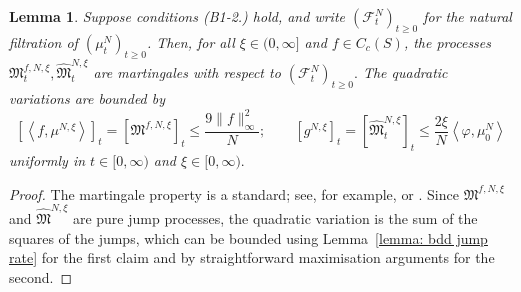 \documentclass[11pt, notitlepage]{article}
\newtheorem{lem}[thm]{Lemma}
\begin{document}
\begin{lem}\label{lemma: qvar}
Suppose conditions (B1-2.) hold, and write $(\mathcal{F}^{N}_t)_{t\ge 0}$ for the natural filtration of $(\mu^N_t)_{t\ge 0}$. Then, for all $\xi \in (0, \infty]$ and $f\in C_c(S)$, the processes $\mathfrak{M}_t^{f,N,\xi}, \widehat{\mathfrak{M}}_t^{N,\xi}$ are martingales with respect to $(\mathcal{F}^N_t)_{t\ge 0}.$
The quadratic variations are bounded by
\begin{equation}
    \left[\left<f, \mu^{N,\xi}\right>\right]_t
    = \left[\mathfrak{M}^{f,N,\xi}\right]_t
    \leq \frac{9 \|f\|_\infty^2}{N}; \qquad
    \left[g^{N,\xi}\right]_t
    = \left[\widehat{\mathfrak{M}}_t^{N,\xi}\right]_t
    \leq \frac{2\xi}{N}\left<\varphi, \mu^N_0\right>
\end{equation} uniformly in $ t \in [0,\infty)$ and $ \xi \in [0,\infty).$
\end{lem}
\begin{proof}
The martingale property is a standard; see, for example, \cite[Chapter 4, Proposition 1.7]{EK86} or \cite[Lemma 19.21]{K02}.
Since $\mathfrak{M}^{f,N,\xi}$ and $\widehat{\mathfrak{M}}^{N,\xi}$ are pure jump processes, the quadratic variation is the sum of the squares of the jumps, which can be bounded using Lemma~\ref{lemma: bdd jump rate} for the first claim and by straightforward maximisation arguments for the second.
\end{proof}

\iffalse Having now proven the tightness, we will argue that the only possible limit point is the deterministic path $(\mu_t)_{t\ge 0}$ given as the solution to (\ref{eq: E+G}). \fi
\end{document}
